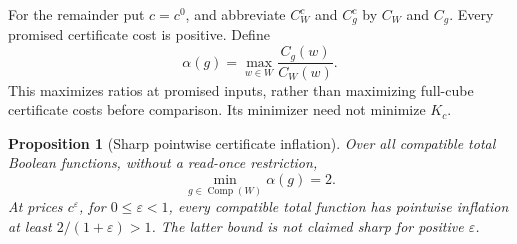 \documentclass[pdflatex,sn-mathphys-num]{sn-jnl}
\newcommand{\Comp}{\operatorname{Comp}}
\theoremstyle{thmstyleone}
\newtheorem{proposition}[theorem]{Proposition}
\theoremstyle{thmstylethree}
\theoremstyle{thmstyletwo}
\begin{document}
For the remainder put $c=c^0$, and abbreviate $C_W^c$ and $C_g^c$ by
$C_W$ and $C_g$. Every promised certificate cost is positive. Define
\[
 \alpha(g)=\max_{w\in W}\frac{C_g(w)}{C_W(w)}.
\]
This maximizes ratios at promised inputs, rather than maximizing
full-cube certificate costs before comparison. Its minimizer need
not minimize $K_c$.

\begin{proposition}[Sharp pointwise certificate inflation]
\label{prop:pointwise-certificate}
Over all compatible total Boolean functions, without a read-once
restriction,
\[
 \min_{g\in\Comp(W)}\alpha(g)=2.
\]
At prices $c^\varepsilon$, for $0\leq\varepsilon<1$, every compatible
total function has pointwise inflation at least
$2/(1+\varepsilon)>1$. The latter bound is not claimed sharp for
positive $\varepsilon$.
\end{proposition}
\end{document}
